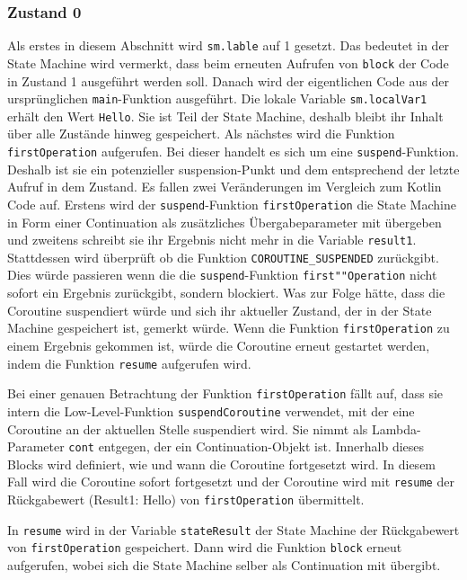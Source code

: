 \documentclass[fontsize=12pt,paper=a4,twoside=semi,parskip=half-,headsepline,headinclude]{scrreprt}
\begin{document}
\subsubsection{Zustand 0}

Als erstes in diesem Abschnitt wird \texttt{sm.lable} auf 1 gesetzt. Das bedeutet in der State Machine wird vermerkt, dass beim erneuten Aufrufen von \texttt{block} der Code in Zustand 1 ausgeführt werden soll. Danach wird der eigentlichen Code aus der ursprünglichen \texttt{main}-Funktion ausgeführt. Die lokale Variable \texttt{sm.localVar1} erhält den Wert \texttt{Hello}. Sie ist Teil der State Machine, deshalb bleibt ihr Inhalt über alle Zustände hinweg gespeichert. Als nächstes wird die Funktion \texttt{firstOperation} aufgerufen. Bei dieser handelt es sich um eine \texttt{suspend}-Funktion. Deshalb ist sie ein potenzieller suspension-Punkt und dem entsprechend der letzte Aufruf in dem Zustand. Es fallen zwei Veränderungen im Vergleich zum Kotlin Code auf. Erstens wird der \texttt{suspend}-Funktion \texttt{firstOperation} die State Machine in Form einer Continuation als zusätzliches Übergabeparameter mit übergeben und zweitens schreibt sie ihr Ergebnis nicht mehr in die Variable \texttt{result1}. Stattdessen wird überprüft ob die Funktion \texttt{COROUTINE\_SUSPENDED} zurückgibt\cite{Akhin2024}. Dies würde passieren wenn die die \texttt{suspend}-Funktion \texttt{first""Operation} nicht sofort ein Ergebnis zurückgibt, sondern blockiert. Was zur Folge hätte, dass die Coroutine suspendiert würde und sich ihr aktueller Zustand, der in der State Machine gespeichert ist, gemerkt würde. Wenn die Funktion \texttt{firstOperation} zu einem Ergebnis gekommen ist, würde die Coroutine erneut gestartet werden, indem die Funktion \texttt{resume} aufgerufen wird.

Bei einer genauen Betrachtung der Funktion \texttt{firstOperation} fällt auf, dass sie intern die Low-Level-Funktion \texttt{suspendCoroutine} verwendet, mit der eine Coroutine an der aktuellen Stelle suspendiert wird. Sie nimmt als Lambda-Parameter \texttt{cont} entgegen, der ein Continuation-Objekt ist. Innerhalb dieses Blocks wird definiert, wie und wann die Coroutine fortgesetzt wird. In diesem Fall wird die Coroutine sofort fortgesetzt und der Coroutine wird mit \texttt{resume} der Rückgabewert (Result1: Hello) von \texttt{firstOperation} übermittelt.

In \texttt{resume} wird in der Variable \texttt{stateResult} der State Machine der Rückgabewert von \texttt{firstOperation} gespeichert. Dann wird die Funktion \texttt{block} erneut aufgerufen, wobei sich die State Machine selber als Continuation mit übergibt.
\end{document}
